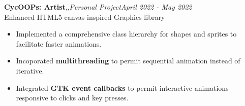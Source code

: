 \textbf{CycOOPs: Artist}\sep\cpp\sep{\it Personal Project}\hfill{\sl \small April 2022 - May 2022}\\
\vspace{-8pt}
\emerrow Enhanced HTML5-canvas-inspired Graphics library 
\begin{itemize}[itemsep = -1.7 mm, leftmargin=*]
\item Implemented a comprehensive class hierarchy for shapes and sprites to facilitate faster animations.
\item Incoporated \textbf{multithreading} to permit sequential animation instead of iterative.
\item Integrated \textbf{GTK event callbacks} to permit interactive animations responsive to clicks and key presses.
\end{itemize}
